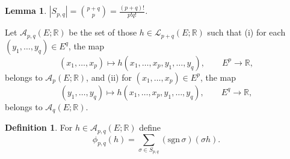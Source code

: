 \documentclass{amsart}
\newcommand{\sgn}{\mathrm{sgn}\,}
\newtheorem{lemma}[theorem]{Lemma}
\theoremstyle{definition}
\newtheorem{definition}[theorem]{Definition}
\begin{document}
\begin{lemma}
$|S_{p,q}| = \binom{p+q}{p} = \frac{(p+q)!}{p!q!}$.
\end{lemma}

Let $\mathscr{A}_{p,q}(E;\mathbb{R})$ be the set of those
$h \in \mathscr{L}_{p+q}(E;\mathbb{R})$ such that (i) for each $(y_1,\ldots,y_q) \in E^q$, the map
\[
(x_1,\ldots,x_p) \mapsto h(x_1,\ldots,x_p,y_1,\ldots,y_q),\qquad
E^p \to \mathbb{R},
\]
belongs to $\mathscr{A}_p(E;\mathbb{R})$, and (ii)
for $(x_1,\ldots,x_p) \in E^p$, the map
\[
(y_1,\ldots,y_q) \mapsto h(x_1,\ldots,x_p,y_1,\ldots,y_q),
\qquad E^q \to \mathbb{R},
\]
belongs to $\mathscr{A}_q(E;\mathbb{R})$.

\begin{definition}
For $h \in \mathscr{A}_{p,q}(E;\mathbb{R})$ define
\[
\phi_{p,q}(h) = \sum_{\sigma \in S_{p,q}} (\sgn \sigma) (\sigma h).
\]
\end{definition}
\end{document}
